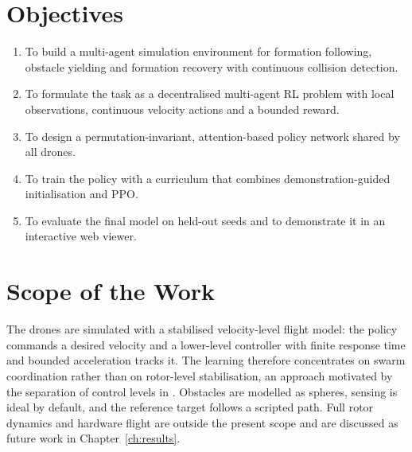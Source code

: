 \section{Objectives}
\begin{enumerate}
  \item To build a multi-agent simulation environment for formation following, obstacle yielding and formation
        recovery with continuous collision detection.
  \item To formulate the task as a decentralised multi-agent RL problem with local observations, continuous
        velocity actions and a bounded reward.
  \item To design a permutation-invariant, attention-based policy network shared by all drones.
  \item To train the policy with a curriculum that combines demonstration-guided initialisation and PPO.
  \item To evaluate the final model on held-out seeds and to demonstrate it in an interactive web viewer.
\end{enumerate}

\section{Scope of the Work}
The drones are simulated with a stabilised velocity-level flight model: the policy commands a desired velocity
and a lower-level controller with finite response time and bounded acceleration tracks it. The learning
therefore concentrates on swarm coordination rather than on rotor-level stabilisation, an approach motivated by
the separation of control levels in \cite{panerati2021learning}. Obstacles are modelled as spheres, sensing is
ideal by default, and the reference target follows a scripted path. Full rotor dynamics and hardware flight
are outside the present scope and are discussed as future work in Chapter~\ref{ch:results}.
